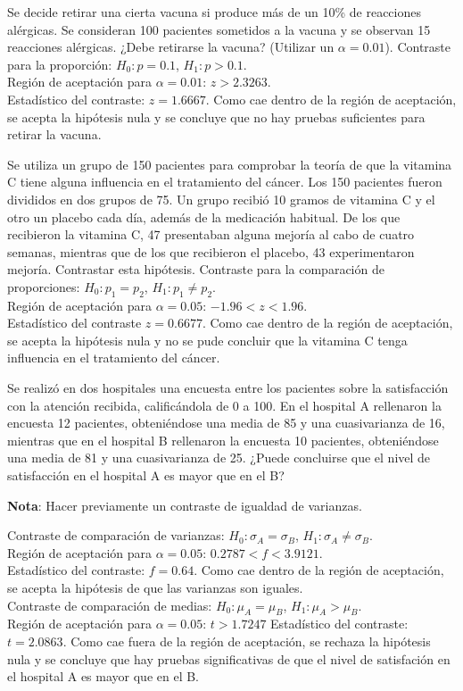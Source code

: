 {Se decide retirar una cierta vacuna si produce más de un 10\% de reacciones alérgicas. Se consideran 100 pacientes sometidos a la vacuna y
se observan 15 reacciones alérgicas. ¿Debe retirarse la vacuna? (Utilizar un $\alpha =0.01$).
}
{Contraste para la proporción: $H_0: p=0.1$, $H_1: p>0.1$.\\
Región de aceptación para $\alpha=0.01$: $z>2.3263$.\\
Estadístico del contraste: $z=1.6667$. Como cae dentro de la región de aceptación, se acepta la hipótesis nula y se
concluye que no hay pruebas suficientes para retirar la vacuna.
}
{}


{Se utiliza un grupo de 150 pacientes para comprobar la teoría de que la vitamina C tiene alguna influencia en el
tratamiento del cáncer.
Los 150 pacientes fueron divididos en dos grupos de 75. Un grupo recibió 10 gramos de vitamina C y el otro un placebo
cada día, además de la medicación habitual.
De los que recibieron la vitamina C, 47 presentaban alguna mejoría al cabo de cuatro semanas, mientras que de los que
recibieron el placebo, 43 experimentaron mejoría.
Contrastar esta hipótesis.
}
{
Contraste para la comparación de proporciones: $H_0:p_1=p_2$, $H_1:p_1\neq p_2$.\\
Región de aceptación para $\alpha=0.05$: $-1.96<z<1.96$.\\
Estadístico del contraste $z=0.6677$. Como cae dentro de la región de aceptación, se acepta la hipótesis nula
y no se pude concluir que la vitamina C tenga influencia en el tratamiento del cáncer.
}
{}


{Se realizó en dos hospitales una encuesta entre los pacientes sobre la satisfacción con la atención recibida,
calificándola de 0 a 100.
En el hospital A rellenaron la encuesta 12 pacientes, obteniéndose una media de 85 y una cuasivarianza de 16, mientras
que en el hospital B rellenaron la encuesta 10 pacientes, obteniéndose una media de 81 y una cuasivarianza de 25.
¿Puede concluirse que el nivel de satisfacción en el hospital A es mayor que en el B?

\noindent \textbf{Nota}: Hacer previamente un contraste de igualdad de varianzas.
}
{Contraste de comparación de varianzas: $H_0:\sigma_A=\sigma_B$, $H_1:\sigma_A\neq \sigma_B$.\\
Región de aceptación para $\alpha=0.05$: $0.2787<f<3.9121$.\\
Estadístico del contraste: $f=0.64$. Como cae dentro de la región de aceptación, se acepta la
hipótesis de que las varianzas son iguales.\\
Contraste de comparación de medias: $H_0:\mu_A=\mu_B$, $H_1:\mu_A>\mu_B$.\\
Región de aceptación para $\alpha=0.05$: $t>1.7247$
Estadístico del contraste: $t=2.0863$. Como cae fuera de la región de aceptación, se rechaza la hipótesis nula y se
concluye que hay pruebas significativas de que el nivel de satisfación en el hospital A es mayor que en el B.
}
{}


